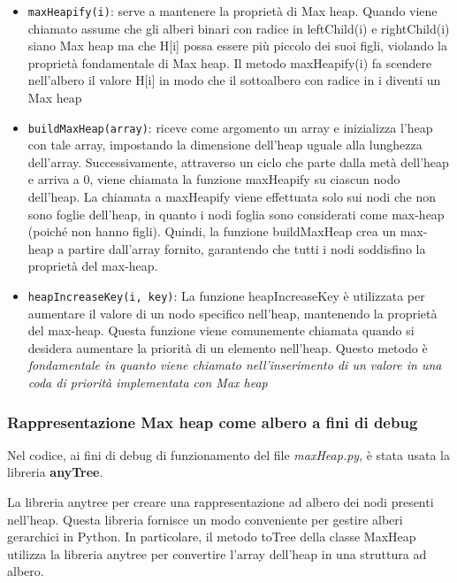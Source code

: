 \documentclass{article}
\begin{document}
\begin{itemize}
    \item \verb|maxHeapify(i)|: serve a mantenere la proprietà di Max heap. Quando viene chiamato assume che gli alberi binari con radice in leftChild(i) e rightChild(i) siano Max heap ma che H[i] possa essere più piccolo dei suoi figli, violando la proprietà fondamentale di Max heap. Il metodo maxHeapify(i) fa scendere nell'albero il valore H[i] in modo che il sottoalbero con radice in i diventi un Max heap

    \item \verb|buildMaxHeap(array)|: riceve come argomento un array e inizializza l'heap con tale array, impostando la dimensione dell'heap uguale alla lunghezza dell'array. Successivamente, attraverso un ciclo che parte dalla metà dell'heap e arriva a 0, viene chiamata la funzione maxHeapify su ciascun nodo dell'heap. La chiamata a maxHeapify viene effettuata solo sui nodi che non sono foglie dell'heap, in quanto i nodi foglia sono considerati come max-heap (poiché non hanno figli). Quindi, la funzione buildMaxHeap crea un max-heap a partire dall'array fornito, garantendo che tutti i nodi soddisfino la proprietà del max-heap.
    
    \item \verb|heapIncreaseKey(i, key)|: La funzione heapIncreaseKey è utilizzata per aumentare il valore di un nodo specifico nell'heap, mantenendo la proprietà del max-heap. Questa funzione viene comunemente chiamata quando si desidera aumentare la priorità di un elemento nell'heap. Questo metodo è \emph{fondamentale in quanto viene chiamato nell'inserimento di un valore in una coda di priorità implementata con Max heap}
\end{itemize}

\clearpage

\subsubsection{Rappresentazione Max heap come albero a fini di debug}
Nel codice, ai fini di debug di funzionamento del file \textit{maxHeap.py}, è stata usata la libreria \textbf{anyTree}.

La libreria anytree per creare una rappresentazione ad albero dei nodi presenti nell'heap. Questa libreria fornisce un modo conveniente per gestire alberi gerarchici in Python. In particolare, il metodo toTree della classe MaxHeap utilizza la libreria anytree per convertire l'array dell'heap in una struttura ad albero.
\end{document}
